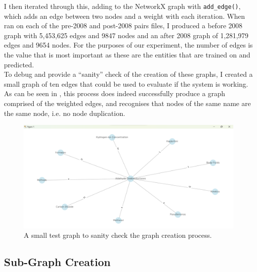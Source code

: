 \documentclass{l4proj}
\begin{document}
I then iterated through this, adding to the NetworkX graph with \texttt{add\_edge()},  which adds an edge between two nodes and a weight with each iteration. When ran on each of the pre-2008 and post-2008 pairs files, I produced a before 2008 graph with 5,453,625 edges and 9847 nodes and an after 2008 graph of 1,281,979 edges and 9654 nodes. For the purposes of our experiment, the number of edges is the value that is most important as these are the entities that are trained on and predicted. \\

To debug and provide a ``sanity'' check of the creation of these graphs, I created a small graph of ten edges that could be used to evaluate if the system is working. As can be seen in , this process does indeed successfully produce a graph comprised of the weighted edges, and recognises that nodes of the same name are the same node, i.e. no node duplication. \\

\begin{figure}[h]
    \centering
    \includegraphics[width=\linewidth]{images/test_graph_creation.png}
    \caption{A small test graph to sanity check the graph creation process.}
    \label{fig:test_graph_creation}
\end{figure}

\subsection{Sub-Graph Creation} 
\end{document}
